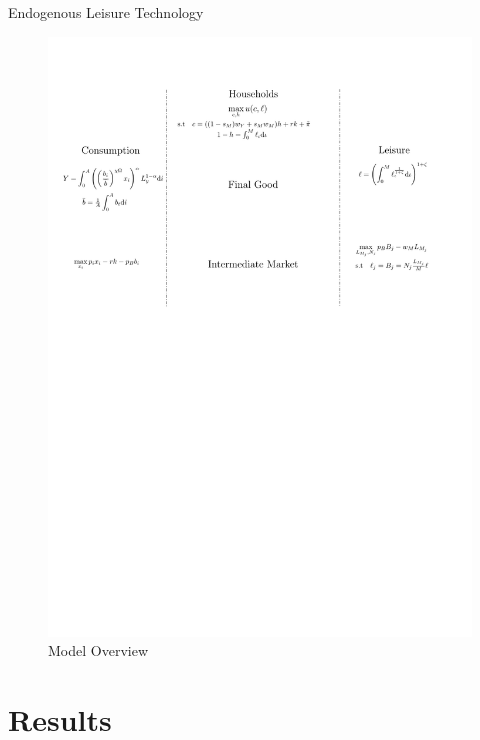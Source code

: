 \documentclass[usenames,dvipsnames]{beamer}
\begin{document}
\begin{frame}{Endogenous Leisure Technology}
    \begin{figure}
        \centering
        \includegraphics[width = \textwidth]{Presentation01/Figures/Mod2.pdf}
        \caption{Model Overview}
    \end{figure}
\end{frame}

\section{Results}
\end{document}
